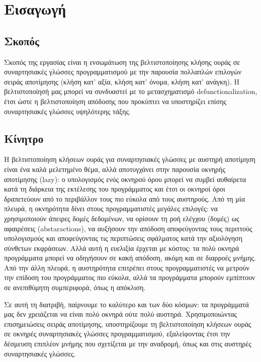 \documentclass[diploma]{softlab-thesis}
\begin{document}

\tableofcontents
\listoftables
\listoffigures



\mainmatter

\chapter{Εισαγωγή}


\section{Σκοπός}
Σκοπός της εργασίας είναι η ενσωμάτωση της βελτιστοποίησης κλήσης ουράς σε συναρτησιακές γλώσσες 
προγραμματισμού με την παρουσία πολλαπλών επιλογών σειράς αποτίμησης 
(κλήση κατ' αξία, κλήση κατ' όνομα, κλήση κατ' ανάγκη). Η βελτιστοποίησή μας μπορεί να συνδυαστεί με το
μετασχηματισμό defunctionalization, έτσι ώστε η 
βελτιστοποίηση απόδοσης που προκύπτει να υποστηρίζει επίσης συναρτησιακές γλώσσες υψηλότερης τάξης.

\section{Κίνητρο}

Η βελτιστοποίηση κλήσεων ουράς για συναρτησιακές γλώσσες με αυστηρή αποτίμηση είναι ένα καλά 
μελετημένο θέμα, αλλά αποτυγχάνει στην
παρουσία οκνηρής αποτίμησης (lazy): ο υπολογισμός ενός οκνηρού όρου μπορεί να συμβεί αυθαίρετα 
κατά τη διάρκεια της εκτέλεσης
του προγράμματος και έτσι οι οκνηροί όροι δραπετεύουν από το περιβάλλον τους 
πιο εύκολα από τους αυστηρούς.
Από τη μία πλευρά, η οκνηρότητα δίνει στους προγραμματιστές μεγάλες επιλογές: 
να χρησιμοποιούν άπειρες δομές δεδομένων,
να ορίσουν τη ροή ελέγχου (δομές) ως αφαιρέσεις (abstaractions), 
να αυξήσουν την απόδοση
αποφεύγοντας τους περιττούς υπολογισμούς και αποφεύγοντας τις περιπτώσεις σφάλματος 
κατά την αξιολόγηση σύνθετων εκφράσεων.
Αλλά αυτή η ευελιξία έρχεται με κόστος: τα πολύ οκνηρά προγράμματα μπορεί 
να οδηγήσουν σε κακή απόδοση, ακόμη και σε διαρροές μνήμης.
Από την άλλη πλευρά, η αυστηρότητα επιτρέπει στους προγραμματιστές να μετρούν
την επίδοση του προγράμματος πιο εύκολα, αλλά τα προγράμματα μπορούν
εμπίπτουν σε ανεπιθύμητη συμπεριφορά, όπως η απόκλιση.

Σε αυτή τη διατριβή, παίρνουμε το καλύτερο και των δύο κόσμων: τα προγράμματά μας δεν χρειάζεται 
να είναι πολύ οκνηρά ούτε πολύ αυστηρά. Χρησιμοποιώντας επισημειώσεις σειράς αποτίμησης, υποστηρίζουμε τη 
βελτιστοποίηση κλήσεων ουράς σε οκνηρές
συναρτησιακές γλώσσες προγραμματισμού, εξαλείφοντας έτσι την δέσμευση επιπλέον μνήμης που σχετίζεται 
με την αναδρομή, όπως και στις αυστηρές συναρτησιακές γλώσσες.
\end{document}
